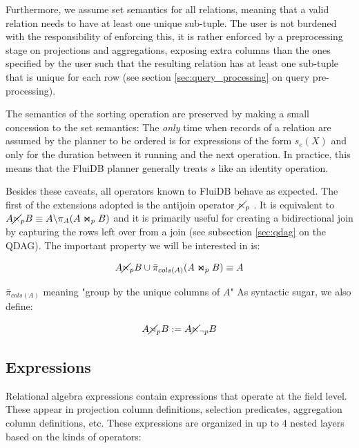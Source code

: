 Furthermore, we assume set semantics for all relations, meaning that a
valid relation needs to have at least one unique sub-tuple. The user
is not burdened with the responsibility of enforcing this, it is
rather enforced by a preprocessing stage on projections and
aggregations, exposing extra columns than the ones specified by the
user such that the resulting relation has at least one sub-tuple that
is unique for each row (see section \ref{sec:query_processing} on
query pre-processing).

The semantics of the sorting operation are preserved by making a small
concession to the set semantics: The \emph{only} time when records of
a relation are assumed by the planner to be ordered is for expressions
of the form \(s_e(X)\) and only for the duration between it running
and the next operation. In practice, this means that the FluiDB
planner generally treats \(s\) like an identity operation.

Besides these caveats, all operators known to FluiDB behave as expected.
The first of the extensions adopted is the antijoin operator
\(\cancel\ltimes_p\) . It is equivalent to
\(A \cancel\ltimes_p B \equiv A \backslash \pi_A(A \Join_p B)\) and it is
primarily useful for creating a bidirectional join by capturing the
rows left over from a join (see subsection \ref{sec:qdag} on the
QDAG). The important property we will be interested in is:

\[
  A \cancel\ltimes_p B \cup \bar\pi_{cols(A)}(A \Join_p B) \equiv A
\]

\(\bar{\pi}_{cols(A)}\) meaning "group by the unique columns of \(A\)"
As syntactic sugar, we also define:

\[
  A \cancel\rtimes_p B := A \cancel\ltimes_{\neg p} B
\]

\subsection{Expressions}
\label{sec:expressions_predicates}

Relational algebra expressions contain expressions that operate at the
field level. These appear in projection column definitions, selection
predicates, aggregation column definitions, etc. These expressions are
organized in up to 4 nested layers based on the kinds of operators:

